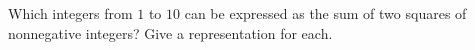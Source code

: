 Which integers from $1$ to $10$ can be expressed as the sum of two squares of nonnegative integers? Give a representation for each.

